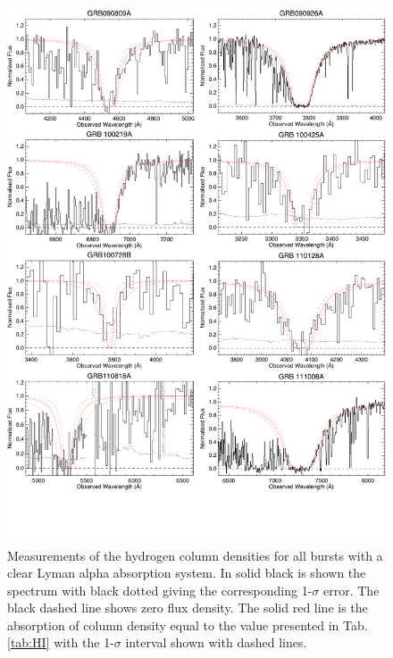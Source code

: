 \documentclass[longauth]{aa}    %
\begin{document}




\clearpage

\begin{figure}[!h]
	\centering
	\includegraphics[page=1, width=\linewidth]{figures/HI_measurements.pdf}
	\caption{Measurements of the hydrogen column densities for all bursts with a
		clear Lyman alpha absorption system. In solid black is shown the spectrum with
		black dotted giving the corresponding 1-$\sigma$ error. The black dashed line shows zero
		flux density. The solid red line is the absorption of column density equal to
		the value presented in Tab. \ref{tab:HI} with the 1-$\sigma$ interval shown
		with dashed lines.}
	\label{fig:HI1}
\end{figure}
\clearpage
\end{document}
